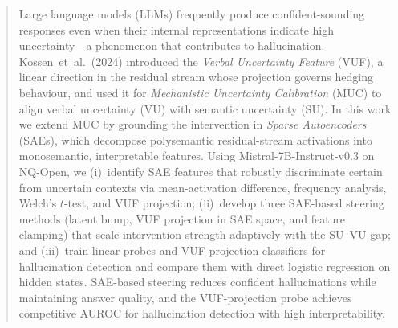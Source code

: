 \documentclass{article}
\begin{document}

\printAffiliationsAndNotice{}

\begin{abstract}
Large language models (LLMs) frequently produce confident-sounding responses
even when their internal representations indicate high uncertainty---a
phenomenon that contributes to hallucination.  Kossen~et~al.\ (2024)
introduced the \emph{Verbal Uncertainty Feature} (VUF), a linear direction in
the residual stream whose projection governs hedging behaviour, and used it for
\emph{Mechanistic Uncertainty Calibration} (MUC) to align verbal uncertainty
(VU) with semantic uncertainty (SU).  In this work we extend MUC by grounding
the intervention in \emph{Sparse Autoencoders} (SAEs), which decompose
polysemantic residual-stream activations into monosemantic, interpretable
features.  Using Mistral-7B-Instruct-v0.3 on NQ-Open, we (i)~identify SAE
features that robustly discriminate certain from uncertain contexts via
mean-activation difference, frequency analysis, Welch's $t$-test, and VUF
projection; (ii)~develop three SAE-based steering methods (latent bump, VUF
projection in SAE space, and feature clamping) that scale intervention strength
adaptively with the SU--VU gap; and (iii)~train linear probes and VUF-projection
classifiers for hallucination detection and compare them with direct logistic
regression on hidden states.  SAE-based steering reduces confident
hallucinations while maintaining answer quality, and the VUF-projection probe
achieves competitive AUROC for hallucination detection with high interpretability.
\end{abstract}
\end{document}
